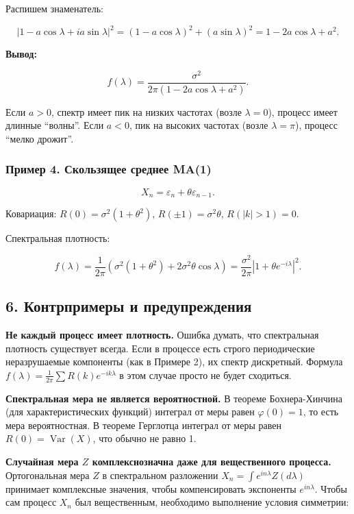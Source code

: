 \documentclass[
  11pt,
  a4paper,
]{article}
\begin{document}
Распишем знаменатель:

\[
|1 - a \cos\lambda + i a \sin\lambda|^2 = (1 - a \cos\lambda)^2 + (a \sin\lambda)^2 = 1 - 2a \cos\lambda + a^2.
\]

\textbf{Вывод:}

\[
f(\lambda) = \frac{\sigma^2}{2\pi (1 - 2a \cos\lambda + a^2)}.
\]

Если \(a > 0\), спектр имеет пик на низких частотах (возле
\(\lambda = 0\)), процесс имеет длинные ``волны''. Если \(a < 0\), пик
на высоких частотах (возле \(\lambda = \pi\)), процесс ``мелко дрожит''.

\subsubsection{Пример 4. Скользящее среднее
MA(1)}\label{ux43fux440ux438ux43cux435ux440-4.-ux441ux43aux43eux43bux44cux437ux44fux449ux435ux435-ux441ux440ux435ux434ux43dux435ux435-ma1}

\[
X_n = \varepsilon_n + \theta \varepsilon_{n-1}.
\]

Ковариация: \(R(0) = \sigma^2(1+\theta^2)\),
\(R(\pm 1) = \sigma^2\theta\), \(R(|k|>1) = 0\).

Спектральная плотность:

\[
f(\lambda) = \frac{1}{2\pi} \left( \sigma^2(1+\theta^2) + 2\sigma^2\theta \cos\lambda \right) = \frac{\sigma^2}{2\pi} |1 + \theta e^{-i\lambda}|^2.
\]

\subsection{6. Контрпримеры и
предупреждения}\label{ux43aux43eux43dux442ux440ux43fux440ux438ux43cux435ux440ux44b-ux438-ux43fux440ux435ux434ux443ux43fux440ux435ux436ux434ux435ux43dux438ux44f}

\textbf{Не каждый процесс имеет плотность.} Ошибка думать, что
спектральная плотность существует всегда. Если в процессе есть строго
периодические неразрушаемые компоненты (как в Примере 2), их спектр
дискретный. Формула
\(f(\lambda) = \frac{1}{2\pi}\sum R(k) e^{-ik\lambda}\) в этом случае
просто не будет сходиться.

\textbf{Спектральная мера не является вероятностной.} В теореме
Бохнера-Хинчина (для характеристических функций) интеграл от меры равен
\(\varphi(0) = 1\), то есть мера вероятностная. В теореме Герглотца
интеграл от меры равен \(R(0) = \operatorname{Var}(X)\), что обычно не
равно 1.

\textbf{Случайная мера \(Z\) комплекснозначна даже для вещественного
процесса.} Ортогональная мера \(Z\) в спектральном разложении
\(X_n = \int e^{in\lambda} Z(d\lambda)\) принимает комплексные значения,
чтобы компенсировать экспоненты \(e^{in\lambda}\). Чтобы сам процесс
\(X_n\) был вещественным, необходимо выполнение условия симметрии:
\end{document}
